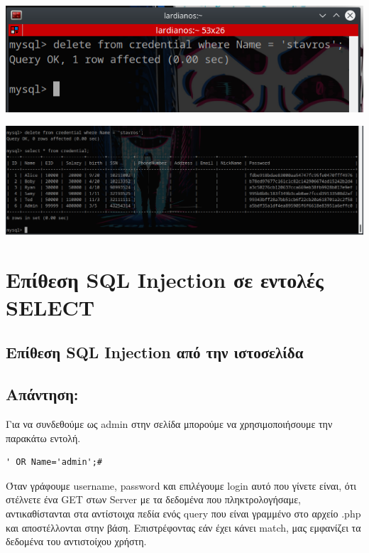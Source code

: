 \begin{center}
			\includegraphics[width=1\textwidth]{image/5.PNG}		
\end{center}

\begin{center}
			\includegraphics[width=1\textwidth]{image/5.1.PNG}		
\end{center}

\newpage
\section{Επίθεση SQL Injection σε εντολές SELECT}

\subsection{Επίθεση SQL Injection από την ιστοσελίδα}
\subsection*{Απάντηση:}
\noindent
Για να συνδεθούμε ως admin στην σελίδα μπορούμε να χρησιμοποιήσουμε την παρακάτω εντολή.
\begin{center}
	\begin{lstlisting}	
' OR Name='admin';#	
	\end{lstlisting}	
\end{center}

\noindent 
Όταν γράφουμε  username, password και επιλέγουμε login αυτό που γίνετε είναι, ότι στέλνετε ένα GET στων 
Server με τα δεδομένα που πληκτρολογήσαμε, αντικαθίστανται στα αντίστοιχα πεδία ενός query που είναι
γραμμένο στο αρχείο .php και αποστέλλονται στην βάση. Επιστρέφοντας εάν έχει κάνει match, μας εμφανίζει
τα δεδομένα του αντιστοίχου χρήστη.

